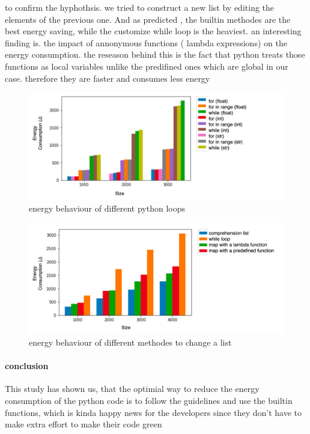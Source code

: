 to confirm the hyphothsis. we tried to construct a new list by editing the elements of the previous one. And as predicted , the builtin methodes are the best energy saving, while the customize while loop is the heaviest. an interesting finding is. the impact of annonymous functions ( lambda expressions) on the energy consumption.
the reseason behind this is the fact that python treats those functions as local variables unlike the predifined ones which are global in our case. therefore they are faster and consumes less energy  %

\begin{figure}[htb]
    \centering
    \includegraphics[width=\linewidth]{imgs/python_iterations}
    \caption{energy behaviour of different python loops }
    \label{fig:pythonloops}
\end{figure}


\begin{figure}[htb]
    \centering
    \includegraphics[width=\linewidth]{imgs/python_treatemens}
    \caption{energy behaviour of different methodes to change a list}
    \label{fig:pythontreatement}
\end{figure}

\paragraph{conclusion}
This study has shown us, that the optimial way to reduce the energy consumption of the python code is to follow the guidelines and use the builtin functions, which is kinda happy news for the developers since they don't have to make extra effort to make their code green



